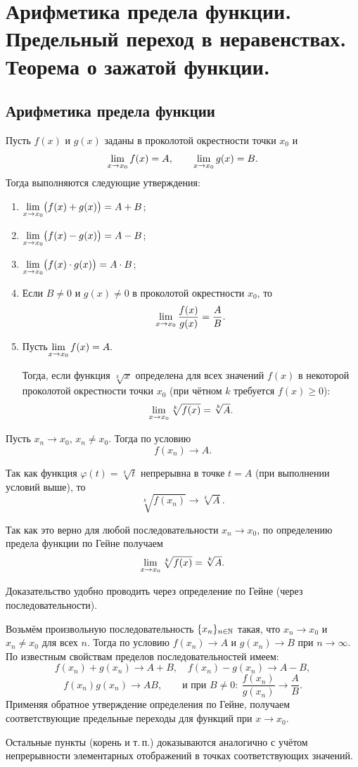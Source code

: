 \section{Арифметика предела функции. Предельный переход в неравенствах. Теорема о зажатой функции.}

\subsection{Арифметика предела функции}

\begin{theorem}
Пусть $f(x)$ и $g(x)$ заданы в проколотой окрестности точки $x_0$ и
\[
    \lim\limits_{x \to x_0} f(x) = A,\qquad \lim\limits_{x \to x_0} g(x) = B.
\]
Тогда выполняются следующие утверждения:
\begin{enumerate}
    \item $\lim\limits_{x \to x_0} \bigl( f(x) + g(x) \bigr) = A + B$;
    \item $\lim\limits_{x \to x_0} \bigl( f(x) - g(x) \bigr) = A - B$;
    \item $\lim\limits_{x \to x_0} \bigl( f(x)\cdot g(x) \bigr) = A\cdot B$;
    \item Если $B\neq 0$ и $g(x)\neq 0$ в проколотой окрестности $x_0$, то
    \[
        \lim\limits_{x \to x_0} \frac{f(x)}{g(x)} = \frac{A}{B}.
    \]
    \item Пусть$\lim\limits_{x \to x_0} f(x) = A.$

Тогда, если функция $\sqrt[k]{x}$ определена для всех значений $f(x)$
в некоторой проколотой окрестности точки $x_0$
(при чётном $k$ требуется $f(x)\ge 0$):
\[
\lim\limits_{x \to x_0} \sqrt[k]{f(x)} = \sqrt[k]{A}.
\]
\end{enumerate}
\end{theorem}

\begin{Proof}
Пусть $x_n \to x_0$, $x_n \neq x_0$.
Тогда по условию
\[
f(x_n)\to A.
\]

Так как функция $\varphi(t)=\sqrt[k]{t}$ непрерывна
в точке $t=A$ (при выполнении условий выше),
то
\[
\sqrt[k]{f(x_n)} \to \sqrt[k]{A}.
\]

Так как это верно для любой последовательности
$x_n \to x_0$, по определению предела функции
по Гейне получаем
\[
\lim\limits_{x \to x_0} \sqrt[k]{f(x)}=\sqrt[k]{A}.
\]
\end{Proof}

\begin{Proof}
Доказательство удобно проводить через определение по Гейне (через последовательности).

Возьмём произвольную последовательность $\{x_n\}_{n\in\mathbb{N}}$ такая, что
$x_n\to x_0$ и $x_n\neq x_0$ для всех $n$. Тогда по условию
$f(x_n)\to A$ и $g(x_n)\to B$ при $n\to\infty$. По известным свойствам пределов последовательностей имеем:
\[
f(x_n)+g(x_n)\to A+B,\quad f(x_n)-g(x_n)\to A-B,
\]
\[
f(x_n)g(x_n)\to AB,\qquad
\text{и при }B\neq0:\ \frac{f(x_n)}{g(x_n)}\to\frac{A}{B}.
\]
Применяя обратное утверждение определения по Гейне, получаем соответствующие предельные переходы для функций при $x\to x_0$.

Остальные пункты (корень и т.\,п.) доказываются аналогично с учётом непрерывности элементарных отображений в точках соответствующих значений.
\end{Proof}

